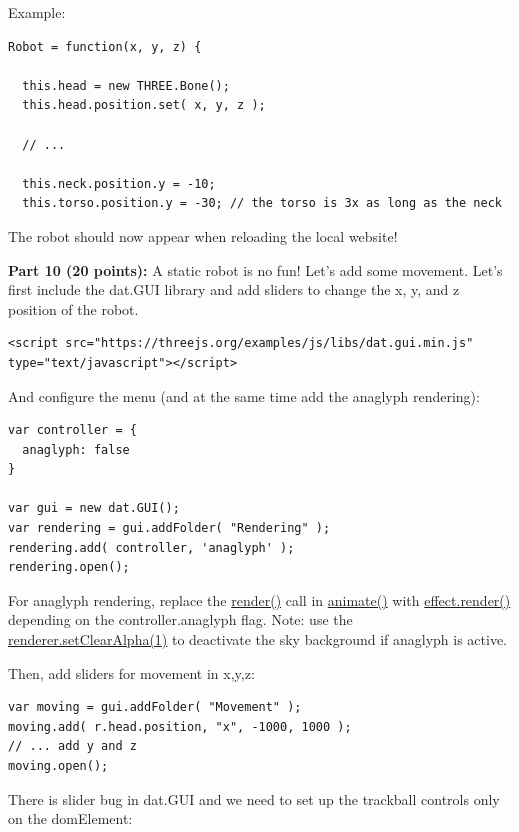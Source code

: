 \documentclass[10pt,oneside,onecolumn,letterpaper]{article}
\begin{document}
\noindent Example:

\begin{verbatim}
Robot = function(x, y, z) {

  this.head = new THREE.Bone();
  this.head.position.set( x, y, z );

  // ...

  this.neck.position.y = -10;
  this.torso.position.y = -30; // the torso is 3x as long as the neck
\end{verbatim}

\noindent The robot should now appear when reloading the local website!


\vspace{.5cm}

\noindent\textbf{Part 10 (20 points):} A static robot is no fun! Let's add some movement. Let's first include the dat.GUI library and add sliders to change the x, y, and z position of the robot.

\begin{verbatim}
<script src="https://threejs.org/examples/js/libs/dat.gui.min.js" type="text/javascript"></script>
\end{verbatim}

\noindent And configure the menu (and at the same time add the anaglyph rendering):

\begin{verbatim}
var controller = {
  anaglyph: false
}

var gui = new dat.GUI();
var rendering = gui.addFolder( "Rendering" );
rendering.add( controller, 'anaglyph' );
rendering.open();
\end{verbatim}

\noindent For anaglyph rendering, replace the \url{render()} call in \url{animate()} with \url{effect.render()} depending on the controller.anaglyph flag. Note: use the \url{renderer.setClearAlpha(1)} to deactivate the sky background if anaglyph is active.

\vspace{.5cm}

\noindent Then, add sliders for movement in x,y,z:

\begin{verbatim}
var moving = gui.addFolder( "Movement" );
moving.add( r.head.position, "x", -1000, 1000 );
// ... add y and z
moving.open();
\end{verbatim}

\noindent There is slider bug in dat.GUI and we need to set up the trackball controls only on the domElement:
\end{document}
